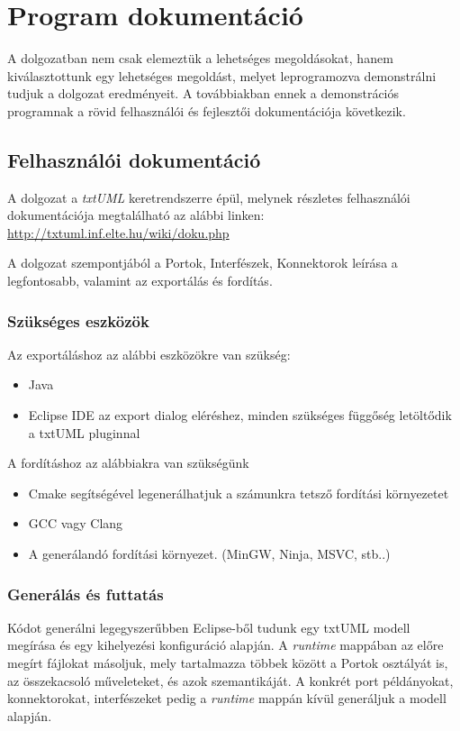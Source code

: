 \documentclass[a4paper,12pt]{report}
\begin{document}
\chapter{Program dokumentáció}
A dolgozatban nem csak elemeztük a lehetséges megoldásokat, hanem kiválasztottunk egy lehetséges megoldást, melyet leprogramozva demonstrálni tudjuk a dolgozat eredményeit. A továbbiakban ennek a demonstrációs programnak a rövid felhasználói és fejlesztői dokumentációja következik.

\section{Felhasználói dokumentáció}
A dolgozat a \textit{txtUML} keretrendszerre épül, melynek részletes felhasználói dokumentációja megtalálható az alábbi linken: \url{http://txtuml.inf.elte.hu/wiki/doku.php}

A dolgozat szempontjából a Portok, Interfészek, Konnektorok leírása a legfontosabb, valamint az exportálás és fordítás.

\subsection{Szükséges eszközök}
Az exportáláshoz az alábbi eszközökre van szükség:
\begin{itemize}
\item Java
\item Eclipse IDE az export dialog eléréshez, minden szükséges függőség letöltődik a txtUML pluginnal
\end{itemize}

A fordításhoz az alábbiakra van szükségünk
\begin{itemize}
\item Cmake segítségével legenerálhatjuk a számunkra tetsző fordítási környezetet
\item GCC vagy Clang
\item A generálandó fordítási környezet. (MinGW, Ninja, MSVC, stb..)
\end{itemize}

\subsection{Generálás és futtatás}
Kódot generálni legegyszerűbben Eclipse-ből tudunk egy txtUML modell megírása és egy kihelyezési konfiguráció alapján. A \textit{runtime} mappában az előre megírt fájlokat másoljuk, mely tartalmazza többek között a Portok osztályát is, az összekacsoló műveleteket, és azok szemantikáját. A konkrét port példányokat, konnektorokat, interfészeket pedig a \textit{runtime} mappán kívül generáljuk a modell alapján. \\
\end{document}
